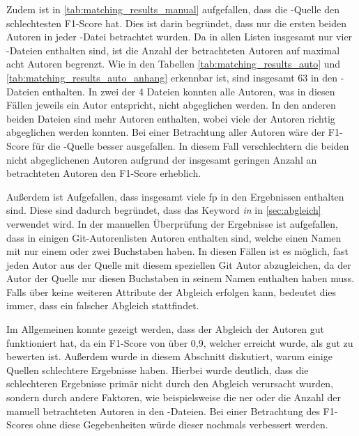 Zudem ist in \autoref{tab:matching_results_manual} aufgefallen, dass die -Quelle den schlechtesten F1-Score hat.
Dies ist darin begründet, dass nur die ersten beiden Autoren in jeder -Datei betrachtet wurden.
Da in allen Listen insgesamt nur vier -Dateien enthalten sind, ist die Anzahl der betrachteten Autoren auf maximal acht Autoren begrenzt.
Wie in den Tabellen \ref{tab:matching_results_auto} und \ref{tab:matching_results_auto_anhang} erkennbar ist, sind insgesamt 63 in den -Dateien enthalten.
In zwei der 4 Dateien konnten alle Autoren, was in diesen Fällen jeweils ein Autor entspricht, nicht abgeglichen werden.
In den anderen beiden Dateien sind mehr Autoren enthalten, wobei viele der Autoren richtig abgeglichen werden konnten.
Bei einer Betrachtung aller Autoren wäre der F1-Score für die -Quelle besser ausgefallen.
In diesem Fall verschlechtern die beiden nicht abgeglichenen Autoren aufgrund der insgesamt geringen Anzahl an betrachteten Autoren den F1-Score erheblich.

Außerdem ist Aufgefallen, dass insgesamt viele \gls{fp} in den Ergebnissen enthalten sind.
Diese sind dadurch begründet, dass das Keyword \emph{in} in \autoref{sec:abgleich} verwendet wird.
In der manuellen Überprüfung der Ergebnisse ist aufgefallen, dass in einigen Git-Autorenlisten Autoren enthalten sind, welche einen Namen mit nur einem oder zwei Buchstaben haben.
In diesen Fällen ist es möglich, fast jeden Autor aus der Quelle mit diesem speziellen Git Autor abzugleichen, da der Autor der Quelle nur diesen Buchstaben in seinem Namen enthalten haben muss.
Falls über keine weiteren Attribute der Abgleich erfolgen kann, bedeutet dies immer, dass ein falscher Abgleich stattfindet.

Im Allgemeinen konnte gezeigt werden, dass der Abgleich der Autoren gut funktioniert hat, da ein F1-Score von über 0,9, welcher erreicht wurde, als gut zu bewerten ist.
Außerdem wurde in diesem Abschnitt diskutiert, warum einige Quellen schlechtere Ergebnisse haben.
Hierbei wurde deutlich, dass die schlechteren Ergebnisse primär nicht durch den Abgleich verursacht wurden, sondern durch andere Faktoren, wie beispielsweise die \gls{ner} oder die Anzahl der manuell betrachteten Autoren in den -Dateien.
Bei einer Betrachtung des F1-Scores ohne diese Gegebenheiten würde dieser nochmals verbessert werden.

